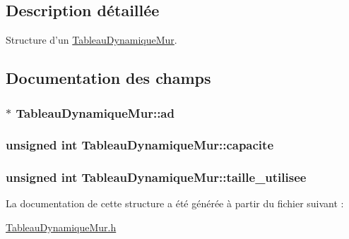 \subsection{Description détaillée}
Structure d'un \hyperlink{structTableauDynamiqueMur}{Tableau\-Dynamique\-Mur}. 

\subsection{Documentation des champs}
\hypertarget{structTableauDynamiqueMur_a922754666b4214fea4cb56fdacddc2e4}{
\subsubsection[{ad}]{$\ast$ Tableau\-Dynamique\-Mur\-::ad}}\label{structTableauDynamiqueMur_a922754666b4214fea4cb56fdacddc2e4}
\hypertarget{structTableauDynamiqueMur_a3ac67653487ce5f4ae8e1c2626469f45}{
\subsubsection[{capacite}]{\setlength{\rightskip}{0pt plus 5cm}unsigned int Tableau\-Dynamique\-Mur\-::capacite}}\label{structTableauDynamiqueMur_a3ac67653487ce5f4ae8e1c2626469f45}
\hypertarget{structTableauDynamiqueMur_a10c3a4a33a8a9071a70788920a8459b5}{
\subsubsection[{taille\-\_\-utilisee}]{\setlength{\rightskip}{0pt plus 5cm}unsigned int Tableau\-Dynamique\-Mur\-::taille\-\_\-utilisee}}\label{structTableauDynamiqueMur_a10c3a4a33a8a9071a70788920a8459b5}


La documentation de cette structure a été générée à partir du fichier suivant \-:\begin{DoxyCompactItemize}
\item 
\hyperlink{TableauDynamiqueMur_8h}{Tableau\-Dynamique\-Mur.\-h}\end{DoxyCompactItemize}
